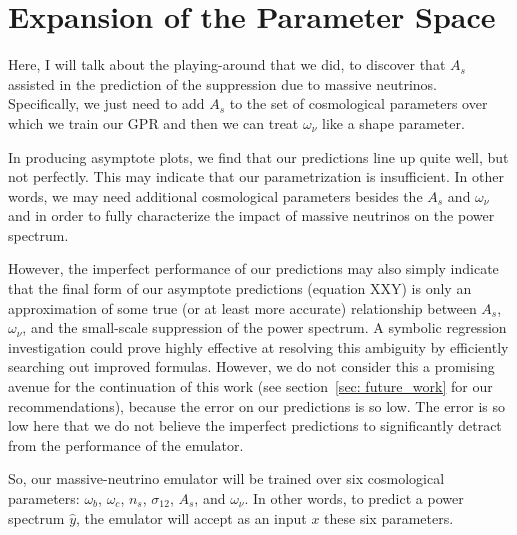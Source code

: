 \chapter{Expansion of the Parameter Space}


Here, I will talk about the playing-around that we did, to discover that
$A_s$ assisted in the prediction of the suppression due to massive neutrinos.
Specifically, we just need to add $A_s$ to the set of cosmological parameters
over which we train our GPR and then we can treat $\omega_\nu$ like a shape
parameter.

In producing asymptote plots, we find that our predictions line up quite well,
but not perfectly. This may indicate that our parametrization is insufficient.
In other words, we may need additional cosmological parameters besides the
$A_s$ and $\omega_\nu$ and in order to fully characterize the impact of
massive neutrinos on the power spectrum.

However, the imperfect performance of our predictions may also simply
indicate that the final form of our asymptote predictions (equation XXY) is
only an approximation of some true (or at least more accurate) relationship
between $A_s$, $\omega_\nu$, and the small-scale suppression of the power
spectrum. A symbolic regression investigation could prove highly effective at
resolving this ambiguity by efficiently searching out improved formulas. 
However, we do not consider this a promising avenue
for the continuation of this work (see section~\ref{sec: future_work} for our
recommendations), because the error on our predictions is so low. The error
is so low here that we do not believe the imperfect predictions to
significantly detract from the performance of the emulator.


So, our massive-neutrino emulator will be trained over six cosmological
parameters: $\omega_b$, $\omega_c$, $n_s$, $\sigma_{12}$, $A_s$, and
$\omega_\nu$. In other words, to predict a power
spectrum $\hat{y}$, the emulator will accept as an input $x$ these six
parameters.

